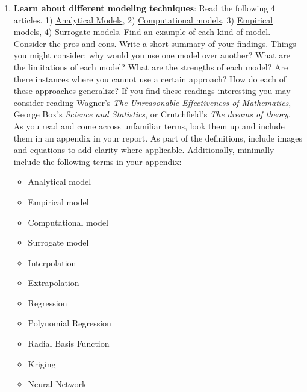\documentclass[12pt]{article}
\begin{document}
\begin{enumerate}
	\item \textbf{Learn about different modeling techniques}: Read the following 4 articles. 1) \href{https://civilengineeringx.com/structural-analysis/analytical-models/}{Analytical Models}, 2) \href{https://en.wikipedia.org/wiki/Computational_model}{Computational models}, 3) \href{https://www.cremeglobal.com/explaining-empirical-and-mechanistic-models/}{Empirical models}, 4) \href{https://en.wikipedia.org/wiki/Surrogate_model}{Surrogate models}.  Find an example of each kind of model.  Consider the pros and cons. Write a short summary of your findings. Things you might consider: why would you use one model over another? What are the limitations of each model? What are the strengths of each model? Are there instances where you cannot use a certain approach? How do each of these approaches generalize?  If you find these readings interesting you may consider reading Wagner's \textit{The Unreasonable Effectiveness of Mathematics}, George Box's \textit{Science and Statistics}, or Crutchfield's \textit{The dreams of theory}. As you read and come across unfamiliar terms, look them up and include them in an appendix in your report.  As part of the definitions, include images and equations to add clarity where applicable.  Additionally, minimally include the following terms in your appendix:
	\begin{multicols}{3}
		\begin{itemize}
			\item Analytical model
			\item Empirical model
			\item Computational model
			\item Surrogate model
			\item Interpolation
			\item Extrapolation
			\item Regression
			\item Polynomial Regression
			\item Radial Basis Function
			\item Kriging
			\item Neural Network
		\end{itemize}
	\end{multicols}
 

\end{enumerate}
\end{document}
